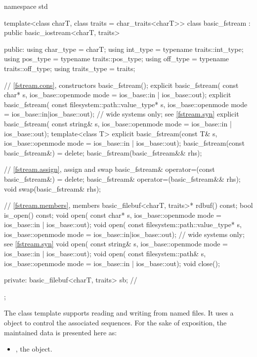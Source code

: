 %
\begin{codeblock}
namespace std {
  template<class charT, class traits = char_traits<charT>>
  class basic_fstream : public basic_iostream<charT, traits> {
  public:
    using char_type   = charT;
    using int_type    = typename traits::int_type;
    using pos_type    = typename traits::pos_type;
    using off_type    = typename traits::off_type;
    using traits_type = traits;

    // \ref{fstream.cons}, constructors
    basic_fstream();
    explicit basic_fstream(
      const char* s,
      ios_base::openmode mode = ios_base::in | ios_base::out);
    explicit basic_fstream(
      const filesystem::path::value_type* s,
      ios_base::openmode mode = ios_base::in|ios_base::out);    // wide systems only; see \ref{fstream.syn}
    explicit basic_fstream(
      const string& s,
      ios_base::openmode mode = ios_base::in | ios_base::out);
    template<class T>
      explicit basic_fstream(const T& s, ios_base::openmode mode = ios_base::in | ios_base::out);
    basic_fstream(const basic_fstream&) = delete;
    basic_fstream(basic_fstream&& rhs);

    // \ref{fstream.assign}, assign and swap
    basic_fstream& operator=(const basic_fstream&) = delete;
    basic_fstream& operator=(basic_fstream&& rhs);
    void swap(basic_fstream& rhs);

    // \ref{fstream.members}, members
    basic_filebuf<charT, traits>* rdbuf() const;
    bool is_open() const;
    void open(
      const char* s,
      ios_base::openmode mode = ios_base::in | ios_base::out);
    void open(
      const filesystem::path::value_type* s,
      ios_base::openmode mode = ios_base::in|ios_base::out);    // wide systems only; see \ref{fstream.syn}
    void open(
      const string& s,
      ios_base::openmode mode = ios_base::in | ios_base::out);
    void open(
      const filesystem::path& s,
      ios_base::openmode mode = ios_base::in | ios_base::out);
    void close();

  private:
    basic_filebuf<charT, traits> sb;    // \expos
  };
}
\end{codeblock}

\pnum
The
class template
supports reading and writing from named files.
It uses a
object to control the associated sequences.
For the sake of exposition, the maintained data is presented here as:
\begin{itemize}
\item
{}, the  object.
\end{itemize}

